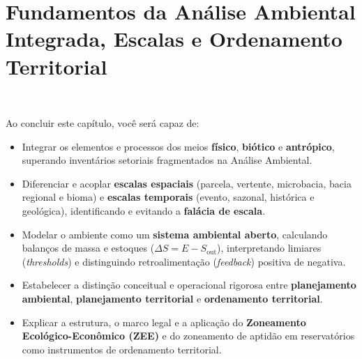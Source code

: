 
\chapter{Fundamentos da Análise Ambiental Integrada, Escalas e Ordenamento Territorial}
\label{cap:analise_integrada}

\noindent\tagEmenta\ \tagPratica
\par\vspace{6pt}

\begin{capObjetivos}
  Ao concluir este capítulo, você será capaz de:
  \begin{itemize}[leftmargin=1.5em, itemsep=2.5pt]
    \item Integrar os elementos e processos dos meios \textbf{físico}, \textbf{biótico} e \textbf{antrópico}, superando inventários setoriais fragmentados na Análise Ambiental.
    \item Diferenciar e acoplar \textbf{escalas espaciais} (parcela, vertente, microbacia, bacia regional e bioma) e \textbf{escalas temporais} (evento, sazonal, histórica e geológica), identificando e evitando a \textbf{falácia de escala}.
    \item Modelar o ambiente como um \textbf{sistema ambiental aberto}, calculando balanços de massa e estoques ($\Delta S = E - S_{\text{out}}$), interpretando limiares (\textit{thresholds}) e distinguindo retroalimentação (\textit{feedback}) positiva de negativa.
    \item Estabelecer a distinção conceitual e operacional rigorosa entre \textbf{planejamento ambiental}, \textbf{planejamento territorial} e \textbf{ordenamento territorial}.
    \item Explicar a estrutura, o marco legal e a aplicação do \textbf{Zoneamento Ecológico-Econômico (ZEE)} e do zoneamento de aptidão em reservatórios como instrumentos de ordenamento territorial.
  \end{itemize}
\end{capObjetivos}

